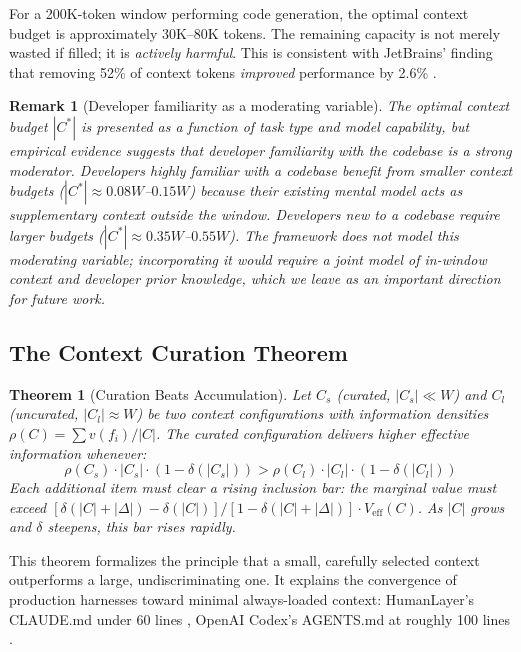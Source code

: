 \documentclass[11pt, a4paper, logo, copyright]{googledeepmind}
\newtheorem{theorem}{Theorem}[section]
\newtheorem*{remark}{Remark}
\begin{document}
For a 200K-token window performing code generation, the optimal context budget is approximately 30K--80K tokens. The remaining capacity is not merely wasted if filled; it is \emph{actively harmful}. This is consistent with JetBrains' finding that removing 52\% of context tokens \emph{improved} performance by 2.6\% \citep{jetbrains2025complexity}.

\begin{remark}[Developer familiarity as a moderating variable]
The optimal context budget $|C^*|$ is presented as a function of task type and model capability, but empirical evidence suggests that developer familiarity with the codebase is a strong moderator. Developers highly familiar with a codebase benefit from smaller context budgets ($|C^*| \approx 0.08W$--$0.15W$) because their existing mental model acts as supplementary context outside the window. Developers new to a codebase require larger budgets ($|C^*| \approx 0.35W$--$0.55W$). The framework does not model this moderating variable; incorporating it would require a joint model of in-window context and developer prior knowledge, which we leave as an important direction for future work.
\end{remark}

\subsection{The Context Curation Theorem}

\begin{theorem}[Curation Beats Accumulation]
\label{thm:curation}
Let $C_s$ (curated, $|C_s| \ll W$) and $C_l$ (uncurated, $|C_l| \approx W$) be two context configurations with information densities $\rho(C) = \sum v(f_i) / |C|$. The curated configuration delivers higher effective information whenever:
\begin{equation}
    \rho(C_s) \cdot |C_s| \cdot (1 - \delta(|C_s|)) > \rho(C_l) \cdot |C_l| \cdot (1 - \delta(|C_l|))
\end{equation}
Each additional item must clear a rising inclusion bar: the marginal value must exceed $[\delta(|C| + |\Delta|) - \delta(|C|)] / [1 - \delta(|C| + |\Delta|)] \cdot V_{\text{eff}}(C)$. As $|C|$ grows and $\delta$ steepens, this bar rises rapidly.
\end{theorem}

This theorem formalizes the principle that a small, carefully selected context outperforms a large, undiscriminating one. It explains the convergence of production harnesses toward minimal always-loaded context: HumanLayer's CLAUDE.md under 60 lines \citep{humanlayer2025skillissue}, OpenAI Codex's AGENTS.md at roughly 100 lines \citep{openai2025codex}.
\end{document}
